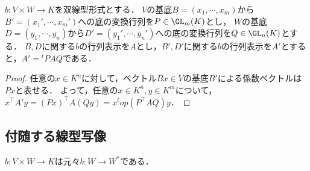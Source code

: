 \documentclass[uplatex, dvipdfmx]{jsreport}
\begin{document}
\begin{proposition}[双線型形式の変換]
    $b:V\times W\to K$を双線型形式とする．
    $V$の基底$B=(x_1,\cdots,x_m)$から$B'=(x_1',\cdots,x_m')$への底の変換行列を$P\in\GL_m(K)$とし，
    $W$の基底$D=(y_1,\cdots,y_n)$から$D'=(y_1',\cdots,y_n')$への底の変換行列を$Q\in\GL_n(K)$とする．
    $B,D$に関する$b$の行列表示を$A$とし，$B',D'$に関する$b$の行列表示を$A'$とすると，$A'={}^t\!PAQ$である．
\end{proposition}
\begin{proof}
    任意の$x\in K^n$に対して，ベクトル$Bx\in V$の基底$B'$による係数ベクトルは$Px$と表せる．
    よって，任意の$x\in K^n,y\in K^m$について，$x^\top A'y=(Px)^\top A(Qy)=x^top(P^\top AQ)y$．
\end{proof}

\subsection{付随する線型写像}

\begin{tcolorbox}[colframe=ForestGreen, colback=ForestGreen!10!white, breakable]
    $b:V\times W\to K$は元々$b:W\to W^*$である．

\end{tcolorbox}
\end{document}
